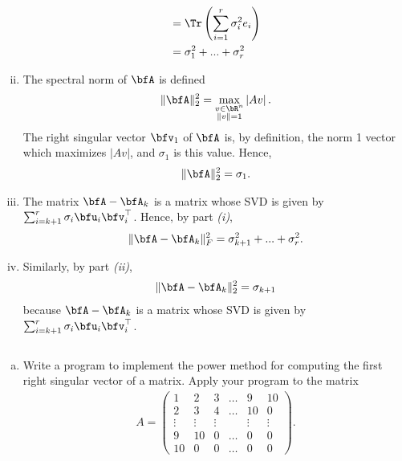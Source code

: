 \begin{homework}[e]
\begin{prf}
\begin{enumerate}[(i)]
\begin{align*}
            &= \Tr\left(\sum_{i=1}^r \sigma_i^2 e_i\right) \\
            &= \sigma^2_1 + ... + \sigma^2_r
        \end{align*}
      \item The spectral norm of $\bfA$ is defined
        \begin{align*}
          \|\bfA\|_2^2 = \max_{\substack{v \in \bR^n\\\|v\| = 1}} \left|A v\right|.
        \end{align*}
        The right singular vector $\bfv_1$ of $\bfA$ is, by definition, the norm 1 vector which maximizes $\left|Av\right|$, and $\sigma_1$ is this value. Hence,
        \begin{align*}
          \|\bfA\|_2^2 = \sigma_1.
        \end{align*}
      \item The matrix $\bfA - \bfA_k$ is a matrix whose SVD is given by $\sum_{i=k+1}^r \sigma_i \bfu_i\bfv_i^\top$. Hence, by part \emph{(i)},
        \begin{align*}
          \|\bfA - \bfA_k\|_F^2 = \sigma_{k+1}^2 + ... + \sigma_r^2.
        \end{align*}
      \item Similarly, by part \emph{(ii)},
        \begin{align*}
          \|\bfA - \bfA_k\|_2^2 = \sigma_{k+1}
        \end{align*}
        because $\bfA - \bfA_k$ is a matrix whose SVD is given by $\sum_{i=k+1}^r \sigma_i\bfu_i\bfv_i^\top$.
    \end{enumerate}
  \end{prf}
  \prob $ $
  \begin{enumerate}[(a)]
    \item Write a program to implement the power method for computing the first right singular vector of a matrix. Apply your program to the matrix
      \begin{align*}
        A = 
        \begin{pmatrix}
          1 & 2 & 3 & \dots & 9 & 10 \\
          2 & 3 & 4 & \dots & 10 & 0 \\
          \vdots & \vdots & \vdots & & \vdots & \vdots \\
          9 & 10 & 0 & \dots & 0 & 0 \\
          10 & 0 & 0 & \dots & 0 & 0 
        \end{pmatrix}.
      \end{align*}

\end{enumerate}
\end{homework}
